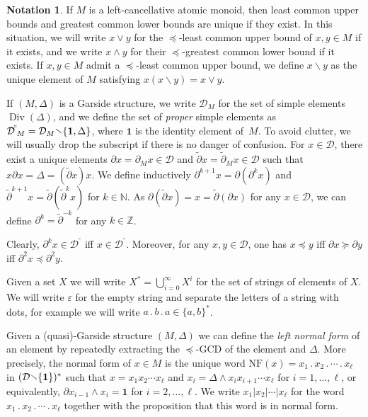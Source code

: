 \documentclass[a4paper,final]{article}
\let\epsilon\varepsilon
\theoremstyle{plain}
\theoremstyle{remark}
\theoremstyle{definition}
\newtheorem{notation}[notation]{Notation}
\begin{document}
\begin{notation}
If $M$ is a left-cancellative atomic monoid, then least common upper bounds and greatest common lower bounds are unique if they exist.  In this situation, we will write $x {\vee} y$ for the ${\preccurlyeq}$-least common upper bound of $x,y\in M$ if it exists, and we write $x {\wedge} y$ for their ${\preccurlyeq}$-greatest common lower bound if it exists.
If $x,y\in M$ admit a ${\preccurlyeq}$-least common upper bound, we define $x{\backslash} y$ as the unique element of $M$ satisfying $x(x{\backslash} y)=x{\vee} y$.

If $(M,\Delta)$ is a Garside structure, we write ${\mathcal{D}}_M$ for the set of simple elements $\operatorname{Div}(\Delta)$, and we define the set of \emph{proper} simple elements as ${{\mathcal{D}}^{\!{}^{\circ}\!}}_M = {\mathcal{D}}_M {\mathbin{\raisebox{0.25ex}{$\smallsetminus$}}} \{ {\mathbf{1}}, \Delta \}$, where ${\mathbf{1}}$ is the identity element of~$M$.  To avoid clutter, we will usually drop the subscript if there is no danger of confusion.
For $x\in{\mathcal{D}}$, there exist a unique elements ${\partial} x={\partial}_M x\in{\mathcal{D}}$ and ${\widetilde{\partial}} x = {\widetilde{\partial}}_M x\in {\mathcal{D}}$ such that $x {\partial} x=\Delta = ({\widetilde{\partial}} x) x$.  We define inductively ${\partial}^{k+1} x = {\partial}({\partial}^k x)$ and ${\widetilde{\partial}}^{k+1} x = {\widetilde{\partial}}({\widetilde{\partial}}^k x)$ for $k\in{\mathbb{N}}$.  As ${\partial} ({\widetilde{\partial}} x) = x = {\widetilde{\partial}}({\partial} x)$ for any $x\in{\mathcal{D}}$, we can define ${\partial}^k = {\widetilde{\partial}}^{-k}$ for any $k\in{\mathbb{Z}}$.

Clearly, ${\partial}^k x\in{{\mathcal{D}}^{\!{}^{\circ}\!}}$ iff $x\in{{\mathcal{D}}^{\!{}^{\circ}\!}}$.
Moreover, for any $x,y\in{\mathcal{D}}$, one has $x{\preccurlyeq} y$ iff ${\partial} x {\succcurlyeq} {\partial} y$ iff ${\partial}^2 x {\preccurlyeq} {\partial}^2 y$.

Given a set $X$ we will write $X^* = {\bigcup}_{i = 0}^{\infty} X^i$ for
the set of strings of elements of $X$.  We will write $\epsilon$ for
the empty string and separate the letters of a string with dots, for
example we will write $a {\mathbin{.}} b {\mathbin{.}} a \in \{a,b\}^*$.

Given a (quasi)-Garside structure $(M, \Delta)$ we can define the \emph{left
normal form} of an element by repeatedly extracting the
${\preccurlyeq}$-GCD of the element and $\Delta$.  More precisely, the
normal form of $x \in M$ is the unique word ${\mathrm{NF}}(x) = x_1 {\mathbin{.}} x_2
{\mathbin{.}} \cdots {\mathbin{.}} x_\ell$ in $({\mathcal{D}}{\mathbin{\raisebox{0.25ex}{$\smallsetminus$}}}\{{\mathbf{1}}\})^*$ such that $x = x_1 x_2 \cdots
x_\ell$ and $x_i = \Delta {\wedge} x_i x_{i+1} \cdots x_\ell$ for $i=1,\ldots,\ell$, or equivalently, ${\partial} x_{i-1} {\wedge} x_i={\mathbf{1}}$ for $i=2,\ldots,\ell$.
We write $x_1|x_2|\cdots|x_\ell$ for the word $x_1 {\mathbin{.}} x_2 {\mathbin{.}} \cdots {\mathbin{.}} x_\ell$
together with the proposition that this word is in normal form.


\end{notation}
\end{document}
